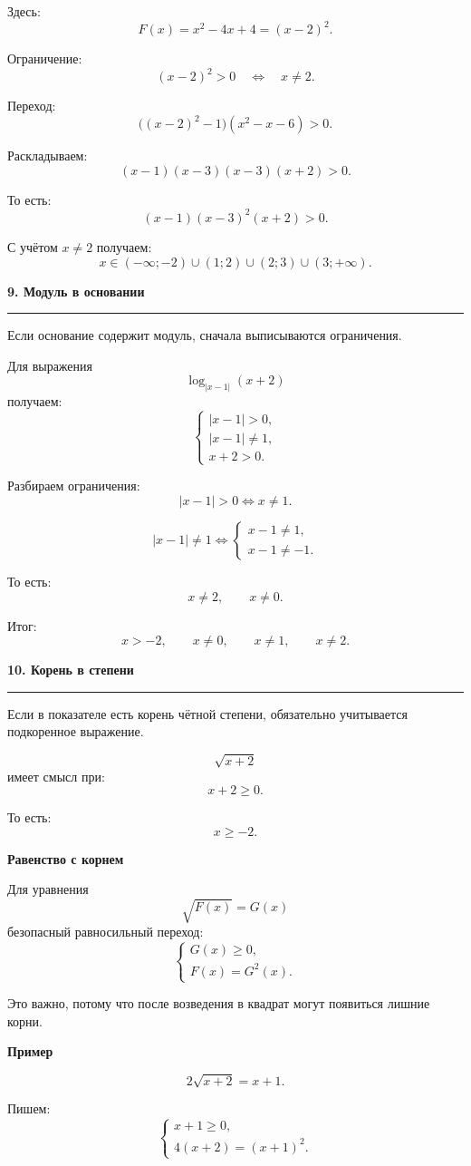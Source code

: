 \documentclass[a4paper,12pt]{article}
\newcommand{\SectionTitle}[1]{%
  \vspace{0.8em}
  {\Large\bfseries\textcolor{darkaccent}{#1}}\par
  \vspace{0.2em}
  {\color{accent}\rule{\linewidth}{0.8pt}}
  \vspace{0.4em}
}
\newcommand{\MiniTitle}[1]{%
  \vspace{0.45em}
  {\bfseries\textcolor{darkaccent}{#1}}\par
}
\begin{document}
Здесь:
\[
F(x)=x^2-4x+4=(x-2)^2.
\]

Ограничение:
\[
(x-2)^2>0
\quad\Longleftrightarrow\quad
x\ne2.
\]

Переход:
\[
\bigl((x-2)^2-1\bigr)(x^2-x-6)>0.
\]

Раскладываем:
\[
(x-1)(x-3)(x-3)(x+2)>0.
\]

То есть:
\[
(x-1)(x-3)^2(x+2)>0.
\]

С учётом \(x\ne2\) получаем:
\[
\boxed{x\in(-\infty;-2)\cup(1;2)\cup(2;3)\cup(3;+\infty)}.
\]

\SectionTitle{9. Модуль в основании}

Если основание содержит модуль, сначала выписываются ограничения.

Для выражения
\[
\log_{|x-1|}(x+2)
\]
получаем:
\[
\begin{cases}
|x-1|>0,\\
|x-1|\ne1,\\
x+2>0.
\end{cases}
\]

Разбираем ограничения:
\[
|x-1|>0
\Longleftrightarrow
x\ne1.
\]

\[
|x-1|\ne1
\Longleftrightarrow
\begin{cases}
x-1\ne1,\\
x-1\ne-1.
\end{cases}
\]

То есть:
\[
x\ne2,\qquad x\ne0.
\]

Итог:
\[
x>-2,\qquad x\ne0,\qquad x\ne1,\qquad x\ne2.
\]

\SectionTitle{10. Корень в степени}

Если в показателе есть корень чётной степени, обязательно учитывается подкоренное выражение.

\[
\sqrt{x+2}
\]
имеет смысл при:
\[
x+2\ge0.
\]

То есть:
\[
x\ge-2.
\]

\MiniTitle{Равенство с корнем}

Для уравнения
\[
\sqrt{F(x)}=G(x)
\]
безопасный равносильный переход:
\[
\boxed{
\begin{cases}
G(x)\ge0,\\
F(x)=G^2(x).
\end{cases}
}
\]

Это важно, потому что после возведения в квадрат могут появиться лишние корни.

\MiniTitle{Пример}

\[
2\sqrt{x+2}=x+1.
\]

Пишем:
\[
\begin{cases}
x+1\ge0,\\
4(x+2)=(x+1)^2.
\end{cases}
\]
\end{document}
